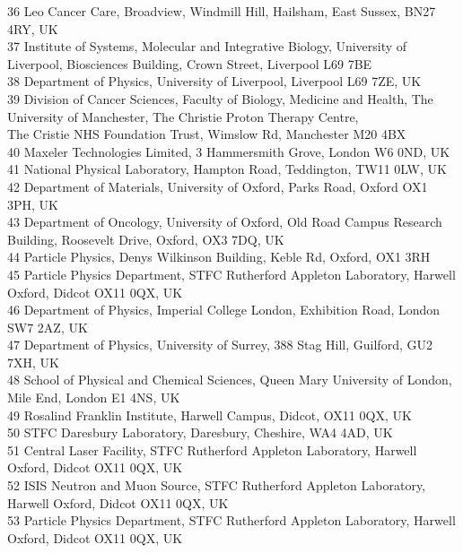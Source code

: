 {\begin{tabbing}
     36 \> Leo Cancer Care, Broadview, Windmill Hill, Hailsham, East Sussex, BN27 4RY, UK\\
     37 \> Institute of Systems, Molecular and Integrative Biology, University of Liverpool, Biosciences Building, Crown Street, Liverpool L69 7BE\\
     38 \> Department of Physics, University of Liverpool, Liverpool L69 7ZE, UK\\
     39 \> Division of Cancer Sciences, Faculty of Biology, Medicine and Health, The University of Manchester, The Christie Proton Therapy Centre, \\ \> The Cristie NHS Foundation Trust, Wimslow Rd, Manchester M20 4BX\\
     40 \> Maxeler Technologies Limited, 3 Hammersmith Grove, London W6 0ND, UK\\
     41 \> National Physical Laboratory, Hampton Road, Teddington, TW11 0LW, UK\\
     42 \> Department of Materials, University of Oxford, Parks Road, Oxford OX1 3PH, UK\\
     43 \> Department of Oncology, University of Oxford, Old Road Campus Research Building, Roosevelt Drive, Oxford, OX3 7DQ, UK\\
     44 \> Particle Physics, Denys Wilkinson Building, Keble Rd, Oxford, OX1 3RH\\
     45 \> Particle Physics Department, STFC Rutherford Appleton Laboratory, Harwell Oxford, Didcot OX11 0QX, UK\\
     46 \> Department of Physics, Imperial College London, Exhibition Road, London SW7 2AZ, UK\\
     47 \> Department of Physics, University of Surrey, 388 Stag Hill, Guilford, GU2 7XH, UK\\
     48 \> School of Physical and Chemical Sciences, Queen Mary University of London, Mile End, London E1 4NS, UK\\
     49 \> Rosalind Franklin Institute, Harwell Campus, Didcot, OX11 0QX, UK\\
     50 \> STFC Daresbury Laboratory, Daresbury, Cheshire, WA4 4AD, UK\\
     51 \> Central Laser Facility, STFC Rutherford Appleton Laboratory, Harwell Oxford, Didcot OX11 0QX, UK\\
     52 \> ISIS Neutron and Muon Source, STFC Rutherford Appleton Laboratory, Harwell Oxford, Didcot OX11 0QX, UK\\
     53 \> Particle Physics Department, STFC Rutherford Appleton Laboratory, Harwell Oxford, Didcot OX11 0QX, UK\\

\end{tabbing}}
